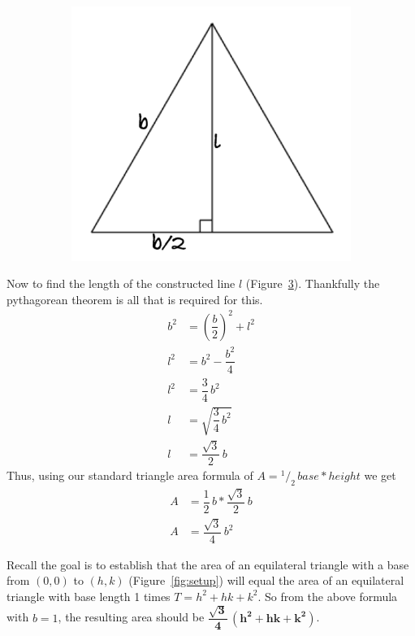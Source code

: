 \documentclass[12pt,letter]{article}
\newcommand*\rfrac[2]{{}^{#1}\!/_{#2}}
\begin{document}
\begin{figure}[h]
\begin{subfigure}[h]{0.3\textwidth}
		\caption{}
		\label{fig:equil_tri_d}
	\end{subfigure}
	~
	\begin{subfigure}[h]{0.3\textwidth}
		\includegraphics[width=\textwidth]{equil_tri_e.pdf}
		\caption{}
		\label{fig:equil_tri_e}
	\end{subfigure}	
\end{figure}

Now to find the length of the constructed line $l$ (Figure~\ref{fig:equil_tri_e}). Thankfully the pythagorean theorem is all that is required for this.
\begin{align*}
b^2 &= \left(\dfrac{b} {2}\right)^2 + l^2 \\
l^2 &= b^2 - \dfrac{b^2} {4} \\
l^2 &= \dfrac{3} {4} \, b^2 \\
l &= \sqrt{\dfrac{3} {4} \, b^2} \\
l &= \dfrac{\sqrt{3}} {2} \, b
\end{align*}
%
Thus, using our standard triangle area formula of $A = \rfrac{1} {2} \, base * height$ we get
\begin{align*}
A &= \dfrac{1} {2} \, b * \dfrac{\sqrt{3}} {2} \, b \\
A &= \dfrac{\sqrt{3}} {4} \, b^2
\end{align*} 

Recall the goal is to establish that the area of an equilateral triangle with a base from $(0,0)$ to $(h,k)$ (Figure~\ref{fig:setup}) will equal the area of an equilateral triangle with base length 1 times $T = h^2 + hk + k^2$. So from the above formula with $b = 1$, the resulting area should be $\mathbf{ \dfrac{\sqrt{3}} {4} \, (h^2 + hk + k^2) }$. 
\end{document}
